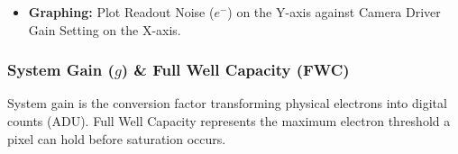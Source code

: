 \documentclass[11pt,a4paper]{article}
\begin{document}
\begin{itemize}[leftmargin=*]
\begin{enumerate}
            $$ \Delta I_{bias} = I_{bias1} - I_{bias2} $$
            \item Compute the standard deviation of the difference frame ($\sigma_{diff}$).
            \item Adjust for the mathematical combination of two frames and multiply by the system gain ($g$, estimated from flat frames; see System Gain section) to convert from ADU to electrons: 
            $$ \sigma_R = \left(\frac{\sigma_{diff}}{\sqrt{2}}\right) \times g $$
        \end{enumerate}
    \item \textbf{Graphing:} Plot Readout Noise ($e^-$) on the Y-axis against Camera Driver Gain Setting on the X-axis.
\end{itemize}

\subsubsection{System Gain ($g$) \& Full Well Capacity (FWC)}
System gain is the conversion factor transforming physical electrons into digital counts (ADU). Full Well Capacity represents the maximum electron threshold a pixel can hold before saturation occurs.
\end{document}
